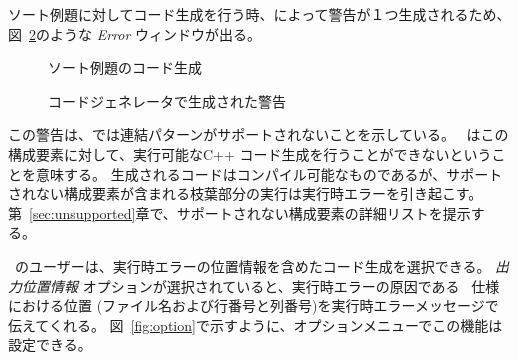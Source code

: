 \documentclass[\pformat,12pt]{jarticle}
\begin{document}
ソート例題に対してコード生成を行う時、\tcg{}によって警告が１つ生成されるため、図~\ref{fig:cg_error}のような {\em Error} ウィンドウが出る。

\begin{figure}[tbh]
\begin{center}
\mbox{}
\caption{ソート例題のコード生成}\label{fig:cg2}
\end{center}
\end{figure}


\begin{figure}[tbh]
\begin{center}
\mbox{}
\caption{コードジェネレータで生成された警告}\label{fig:cg_error}
\end{center}
\end{figure}


この警告は、\tcg{}では連結パターンがサポートされないことを示している。
\tcg\ はこの構成要素に対して、実行可能なC++ コード生成を行うことができないということを意味する。
生成されるコードはコンパイル可能なものであるが、サポートされない構成要素が含まれる枝葉部分の実行は実行時エラーを引き起こす。 
第~\ref{sec:unsupported}章で、サポートされない構成要素の詳細リストを提示する。

\tcg\ のユーザーは、実行時エラーの位置情報を含めたコード生成を選択できる。
{\em 出力位置情報} オプションが選択されていると、実行時エラーの原因である \VDM\ 仕様における位置 (ファイル名および行番号と列番号)を実行時エラーメッセージで伝えてくれる。
 図~\ref{fig:option}で示すように、オプションメニューでこの機能は設定できる。
\end{document}
